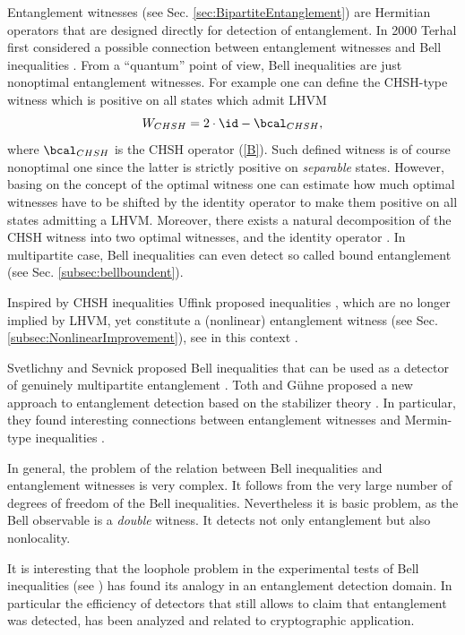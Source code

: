 \documentclass[twocolumn,aps,rmp]{revtex4}
\begin{document}
Entanglement witnesses (see Sec. \ref{sec:BipartiteEntanglement}) are
Hermitian operators that are designed directly for detection of
entanglement. In 2000 Terhal first considered a possible connection
between entanglement witnesses and Bell inequalities \cite
{TerhalB}. From a ``quantum'' point of view, Bell inequalities are
just nonoptimal entanglement witnesses. For example one can define the
CHSH-type witness which is positive on all states which admit
LHVM
\begin{equation}
  W_{CHSH}=2\cdot\id-\bcal_{CHSH}, \label{ter}
\end{equation}
where $\bcal_{CHSH}$ is the CHSH operator (\ref {B}). Such defined
witness is of course nonoptimal one since the latter is strictly
positive on {\it separable} states. However, basing on the concept of
the optimal witness \cite {Lewenstein00a} one can estimate how much
optimal witnesses have to be shifted by the identity operator to make
them positive on all states admitting a LHVM. Moreover, there exists a
natural decomposition of the CHSH witness into two optimal witnesses,
and the identity operator \cite {Hyllus}. In multipartite case, Bell
inequalities can even detect so called bound entanglement
\cite{Dur,Kaszlikowski, Sen, Augusiak} (see
Sec. \ref{subsec:bellboundent}).

Inspired by CHSH inequalities Uffink proposed inequalities
\cite{Uffink2002}, which are no longer implied by LHVM, yet constitute
a (nonlinear) entanglement witness (see
Sec. \ref{subsec:NonlinearImprovement}), see in this context \cite{UffinkS-strong-Bell-2006}.

Svetlichny and Sevnick
proposed Bell inequalities that can be used as a detector of genuinely
multipartite entanglement \cite{Svetlichny}.  Toth and G{\"u}hne
proposed a new approach to entanglement detection  \cite
{TothG_s,TothG_ent_det}based on the stabilizer theory \cite {Gottesman}. In particular,
they found interesting connections between entanglement
witnesses and Mermin-type inequalities \cite{TothG_ent_det}.

In general, the problem of the relation between Bell inequalities and
entanglement witnesses is very complex. It follows from the very large
number of degrees of freedom of the Bell inequalities.  Nevertheless
it is basic problem, as the Bell observable is a {\it double}
witness. It detects not only entanglement but also nonlocality.

It is interesting that the loophole problem in the experimental tests
of Bell inequalities (see \cite{Gill}) has found its analogy
\cite{SkwaraKKB2006} in an entanglement detection domain. In
particular the efficiency of detectors that still allows to claim that
entanglement was detected, has been analyzed and related to
cryptographic application.
\end{document}
